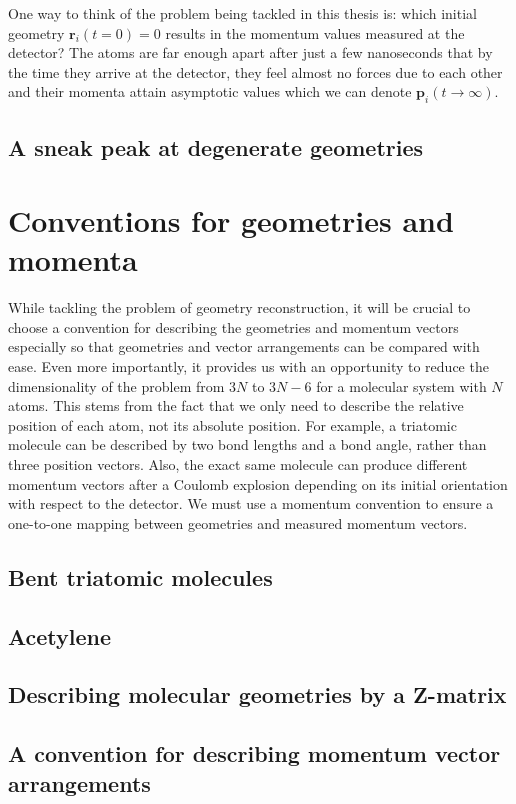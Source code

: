 One way to think of the problem being tackled in this thesis is: which initial geometry $\mathbf{r}_i(t=0) = 0$ results in the momentum values measured at the detector? The atoms are far enough apart after just a few nanoseconds that by the time they arrive at the detector, they feel almost no forces due to each other and their momenta attain asymptotic values which we can denote $\mathbf{p}_i(t\rightarrow\infty)$.

\subsection{A sneak peak at degenerate geometries}

\section{Conventions for geometries and momenta}
While tackling the problem of geometry reconstruction, it will be crucial to choose a convention for describing the geometries and momentum vectors especially so that geometries and vector arrangements can be compared with ease. Even more importantly, it provides us with an opportunity to reduce the dimensionality of the problem from $3N$ to $3N-6$ for a molecular system with $N$ atoms. This stems from the fact that we only need to describe the relative position of each atom, not its absolute position. For example, a triatomic molecule can be described by two bond lengths and a bond angle, rather than three position vectors. Also, the exact same molecule can produce different momentum vectors after a Coulomb explosion depending on its initial orientation with respect to the detector. We must use a momentum convention to ensure a one-to-one mapping between geometries and measured momentum vectors.

\subsection{Bent triatomic molecules}
\subsection{Acetylene}
\subsection{Describing molecular geometries by a Z-matrix}
\subsection{A convention for describing momentum vector arrangements}